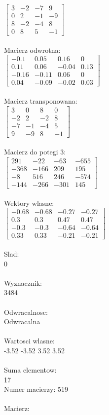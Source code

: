 \documentclass[a4paper,12pt]{article}
\begin{document}
$\begin{bmatrix} 3&-2&-7&9\\0&2&-1&-9\\8&-2&-4&8\\0&8&5&-1 \end{bmatrix}$
\\
\\
Macierz odwrotna:\\

$\begin{bmatrix} -0.1&0.05&0.16&0\\0.11&0.06&-0.04&0.13\\-0.16&-0.11&0.06&0\\0.04&-0.09&-0.02&0.03 \end{bmatrix}$
\\
\\
Macierz transponowana:\\

$\begin{bmatrix} 3&0&8&0\\-2&2&-2&8\\-7&-1&-4&5\\9&-9&8&-1 \end{bmatrix}$
\\
\\
Macierz do potegi 3:\\

$\begin{bmatrix} 291&-22&-63&-655\\-368&-166&209&195\\-8&516&246&-574\\-144&-266&-301&145 \end{bmatrix}$
\\
\\
Wektory wlasne:\\

$\begin{bmatrix} -0.68&-0.68&-0.27&-0.27\\0.3&0.3&0.47&0.47\\-0.3&-0.3&-0.64&-0.64\\0.33&0.33&-0.21&-0.21 \end{bmatrix}$
\\
\\
Slad:\\
0
\\
\\
Wyznacznik:\\
3484
\\
\\
Odwracalnosc:\\
Odwracalna
\\
\\
Wartosci wlasne:\\
-3.52 -3.52 3.52 3.52
\\
\\
Suma elementow:\\
17
\\
\newpage
Numer macierzy:
519
\\
\\
Macierz:\\
\end{document}
